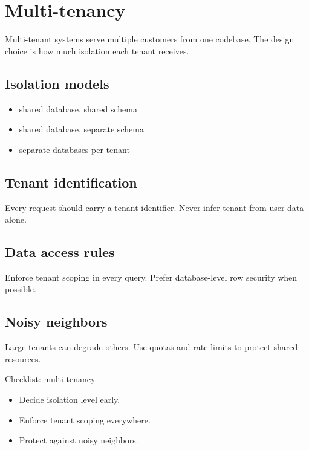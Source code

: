 \chapter{Multi-tenancy}

Multi-tenant systems serve multiple customers from one codebase.
The design choice is how much isolation each tenant receives.

\section{Isolation models}
\begin{itemize}[nosep]
  \item shared database, shared schema
  \item shared database, separate schema
  \item separate databases per tenant
\end{itemize}

\section{Tenant identification}
Every request should carry a tenant identifier.
Never infer tenant from user data alone.

\section{Data access rules}
Enforce tenant scoping in every query.
Prefer database-level row security when possible.

\section{Noisy neighbors}
Large tenants can degrade others.
Use quotas and rate limits to protect shared resources.

\begin{checklistbox}{Checklist: multi-tenancy}
\begin{itemize}[nosep]
  \item Decide isolation level early.
  \item Enforce tenant scoping everywhere.
  \item Protect against noisy neighbors.
\end{itemize}
\end{checklistbox}
